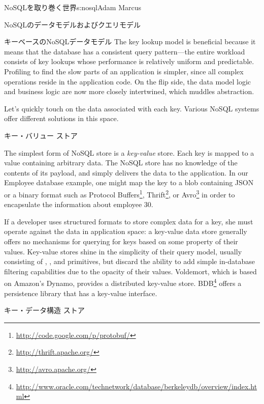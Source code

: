 \begin{aosachapter}{NoSQLを取り巻く世界}{s:nosql}{Adam Marcus}
\begin{aosasect1}{NoSQLのデータモデルおよびクエリモデル}
\begin{aosasect2}{キーベースのNoSQLデータモデル}
The key lookup model is beneficial because it means that the database
has a consistent query pattern---the entire workload consists of key
lookups whose performance is relatively uniform and predictable.
Profiling to find the slow parts of an application is simpler, since
all complex operations reside in the application code.  On the flip
side, the data model logic and business logic are now more closely
intertwined, which muddles abstraction.

Let's quickly touch on the data associated with each key.  Various
NoSQL systems offer different solutions in this space.

\begin{aosasect3}{キー・バリュー ストア}

The simplest form of NoSQL store is a \emph{key-value} store.  Each
key is mapped to a value containing arbitrary data.  The NoSQL store
has no knowledge of the contents of its payload, and simply delivers
the data to the application.  In our Employee database example, one
might map the key  to a blob containing JSON or a
binary format such as Protocol
Buffers\footnote{\url{http://code.google.com/p/protobuf/}},
Thrift\footnote{\url{http://thrift.apache.org/}}, or
Avro\footnote{\url{http://avro.apache.org/}} in order to encapsulate
the information about employee 30.

If a developer uses structured formats to store complex data for a
key, she must operate against the data in application space: a
key-value data store generally offers no mechanisms for querying for
keys based on some property of their values.  Key-value stores shine
in the simplicity of their query model, usually consisting of
, , and  primitives, but discard the
ability to add simple in-database filtering capabilities due to the
opacity of their values.  Voldemort, which is based on Amazon's
Dynamo, provides a distributed key-value store.  BDB\footnote{\url{http://www.oracle.com/technetwork/database/berkeleydb/overview/index.html}} offers a
persistence library that has a key-value interface.

\end{aosasect3}

\begin{aosasect3}{キー・データ構造 ストア}


\end{aosasect3}
\end{aosasect2}
\end{aosasect1}
\end{aosachapter}
